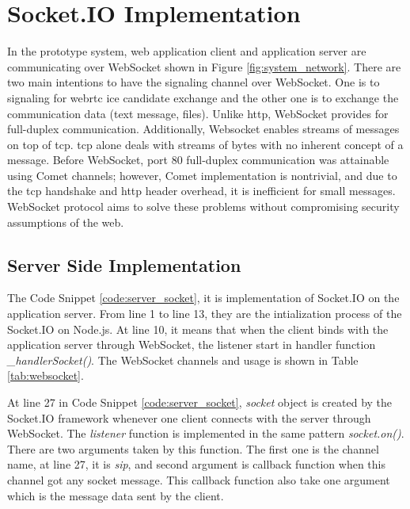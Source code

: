 \section{Socket.IO Implementation}

\noindent In the prototype system, web application client and application server are communicating over WebSocket shown in Figure \ref{fig:system_network}. There are two main intentions to have the signaling channel over WebSocket. One is to signaling for \gls{webrtc} \gls{ice} candidate exchange and the other one is to exchange the communication data (text message, files). Unlike \gls{http}, WebSocket provides for full-duplex communication. Additionally, Websocket enables streams of messages on top of \gls{tcp}. \gls{tcp} alone deals with streams of bytes with no inherent concept of a message. Before WebSocket, port 80 full-duplex communication was attainable using Comet channels; however, Comet implementation is nontrivial, and due to the \gls{tcp} handshake and \gls{http} header overhead, it is inefficient for small messages. WebSocket protocol aims to solve these problems without compromising security assumptions of the web.\cite{wiki:websocket}

\subsection{Server Side Implementation}

\par The Code Snippet \ref{code:server_socket}, it is implementation of Socket.IO on the application server. From line 1 to line 13, they are the intialization process of the Socket.IO on Node.js. At line 10, it means that when the client binds with the application server through WebSocket, the listener start in handler function \textit{\_handlerSocket()}. The WebSocket channels and usage is shown in Table \ref{tab:websocket}.

\par At line 27 in Code Snippet \ref{code:server_socket}, \textit{socket} object is created by the Socket.IO framework whenever one client connects with the server through WebSocket. The \textit{listener} function is implemented in the same pattern \textit{socket.on()}. There are two arguments taken by this function. The first one is the channel name, at line 27, it is \textit{sip}, and second argument is callback function when this channel got any socket message. This callback function also take one argument which is the message data sent by the client.

